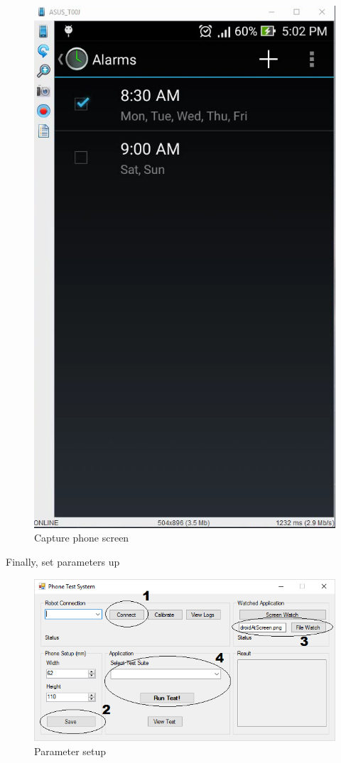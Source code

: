 	\begin{figure}[H]
		\centering
		\includegraphics[scale=0.5]{Chapters/Fig/droidscreen.png}
		\caption{Capture phone screen}
		\label{fig:droidscreen}
	\end{figure}

Finally, set parameters up

	\begin{figure}[H]
		\centering
		\includegraphics[scale=0.5]{Chapters/Fig/prog_setup.png}
		\caption{Parameter setup}
		\label{fig:prog_setup}
	\end{figure}


